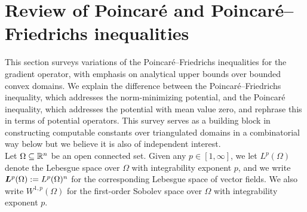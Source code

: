 \documentclass[10pt,a4paper]{article}
\begin{document}
\section{Review of Poincar\'e and Poincar\'e--Friedrichs inequalities}\label{section:poincare}

This section surveys variations of the Poincar\'e--Friedrichs inequalities for the gradient operator,
with emphasis on analytical upper bounds over bounded convex domains. 
We explain the difference between the Poincar\'e--Friedrichs inequality, which addresses the norm-minimizing potential, and the Poincar\'e inequality, which addresses the potential with mean value zero, and rephrase this in terms of potential operators. 
This survey serves as a building block in constructing computable constants over triangulated domains in a combinatorial way below but we believe it is also of independent interest.
\\

Let $\Omega \subseteq {\mathbb R}^{n}$ be an open connected set. 
Given any $p \in [1,\infty]$, we let $L^{p}(\Omega)$ denote the Lebesgue space over $\Omega$ with integrability exponent $p$, and we write $\bm{L}^{p}(\Omega) := L^{p}(\Omega)^{n}$ for the corresponding Lebesgue space of vector fields. 
We also write $W^{1,p}(\Omega)$ for the first-order Sobolev space over $\Omega$ with integrability exponent $p$. 

\end{document}
